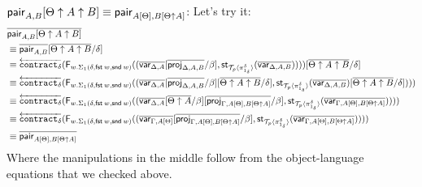 \documentclass[10pt]{article}
\theoremstyle{definition}
\newcommand\dsd[1]{\ensuremath{\mathsf{#1}}}
\newcommand{\app}[2]{\ensuremath{#1 \: #2}}
\newcommand{\fst}[1]{\app{\dsd{fst}}{#1}}
\newcommand{\snd}[1]{\app{\dsd{snd}}{#1}}
\newcommand{\rewrite}[2]{\overleftarrow{#1}(#2)}
\newcommand\StI[2]{\ensuremath{\mathsf{st}_{#1}(#2)}}
\newcommand\FIs[2]{\ensuremath{\mathsf{F}_{#1}{(#2)}}}
\newcommand\ApEl[2]{\mathcal{T}_{#1}\langle#2\rangle}
\begin{document}
\begin{enumerate}[style = multiline, labelwidth = 80pt]
\item[{$\mathsf{pair}_{A, B}[\Theta \uparrow A \uparrow B] \equiv \mathsf{pair}_{A[\Theta], B[\Theta \uparrow A]}$}:]
Let's try it:
\begin{align*}
&\upstairs{\qpair{A, B}[\Theta \uparrow A \uparrow B]} \\
&\equiv \upstairs{\qpair{A, B}}[\upstairs{\Theta \uparrow A \uparrow B}/\delta] \\
&\equiv \rewrite{\contract{\delta}}{\FIs{w. \Sigma_1(\delta,\fst w, \snd w)}{(\upstairs{\var{\Delta, A}}[\upstairs{\proj{\Delta, A, B}}/\beta], \StI{\ApEl{p}{\pi^{\delta}_{1_{\delta}}}}{\upstairs{\var{\Delta, A, B}}})}}[\upstairs{\Theta \uparrow A \uparrow B}/\delta] \\
&\equiv \rewrite{\contract{\delta}}{\FIs{w. \Sigma_1(\delta,\fst w, \snd w)}{(\upstairs{\var{\Delta, A}}[\upstairs{\proj{\Delta, A, B}}/\beta][\upstairs{\Theta \uparrow A \uparrow B}/\delta], \StI{\ApEl{p}{\pi^{\delta}_{1_{\delta}}}}{\upstairs{\var{\Delta, A, B}}}[\upstairs{\Theta \uparrow A \uparrow B}/\delta])}} \\
&\equiv \rewrite{\contract{\delta}}{\FIs{w. \Sigma_1(\delta,\fst w, \snd w)}{(\upstairs{\var{\Delta, A}}[\upstairs{\Theta \uparrow A}/\beta][\upstairs{\proj{\Gamma, A[\Theta], B[\Theta \uparrow A]}}/\beta], \StI{\ApEl{p}{\pi^{\delta}_{1_{\delta}}}}{\upstairs{\var{\Gamma, A[\Theta], B[\Theta \uparrow A]}}})}} \\
&\equiv \rewrite{\contract{\delta}}{\FIs{w. \Sigma_1(\delta,\fst w, \snd w)}{(\upstairs{\var{\Gamma, A[\Theta]}}[\upstairs{\proj{\Gamma, A[\Theta], B[\Theta \uparrow A]}}/\beta], \StI{\ApEl{p}{\pi^{\delta}_{1_{\delta}}}}{\upstairs{\var{\Gamma, A[\Theta], B[\Theta \uparrow A]}}})}} \\
&\equiv \upstairs{\qpair{A[\Theta], B[\Theta \uparrow A]}}
\end{align*}
Where the manipulations in the middle follow from the object-language equations that we checked above.


\end{enumerate}
\end{document}
